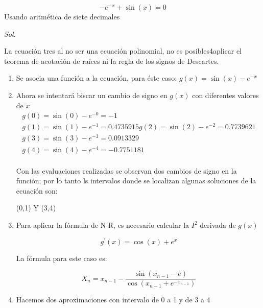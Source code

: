 
\begin{problem}
\begin{equation*}
	-e^{-x}+\sin(x)=0
\end{equation*}
Usando aritmética de siete decimales
\end{problem}

\textit{ Sol. }

La ecuación tres al no ser una ecuación polinomial, no es posibles4aplicar el teorema de acotación de raíces ni la regla de
los signos de Descartes.

\begin{enumerate}
	\item Se asocia una función a la ecuación, para éste caso: $g(x)=\sin(x)-e^{-x}$
	\item Ahora se intentará biscar un cambio de signo en $g(x)$ con diferentes valores de $x$
	      \begin{align*}
		      g(0)=\sin(0)-e^{-0}=-1         \\
		      g(1)=\sin(1)-e^{-1}=0.4735915
		      g(2)=\sin(2)-e^{-2}=0.7739621  \\
		      g(3)=\sin(3)-e^{-3}=0.0913329  \\
		      g(4)=\sin(4)-e^{-4}=-0.7751181 \\
	      \end{align*}

	      Con las evaluaciones realizadas se observan dos cambios de signo en la función;
	      por lo tanto ls intervalos donde se localizan algunas soluciones de la ecuación son:

	      (0,1) Y (3,4)

	\item Para aplicar la fórmula de N-R, es necesario calcular la $I^2$ derivada de $g(x)$

	      \begin{equation*}
		      g^{\prime}(x)=\cos(x)+e^{x}
	      \end{equation*}

	      La fórmula para este caso es:

	      \begin{equation*}
		      X_n=x_{n-1}-\frac{\sin(x_{n-1}-e)}{\cos(x_{n-1}+e^{-x_{n-1}})}
	      \end{equation*}

	\item Hacemos dos aproximaciones con intervalo de 0 a 1 y de 3 a  4


\end{enumerate}
